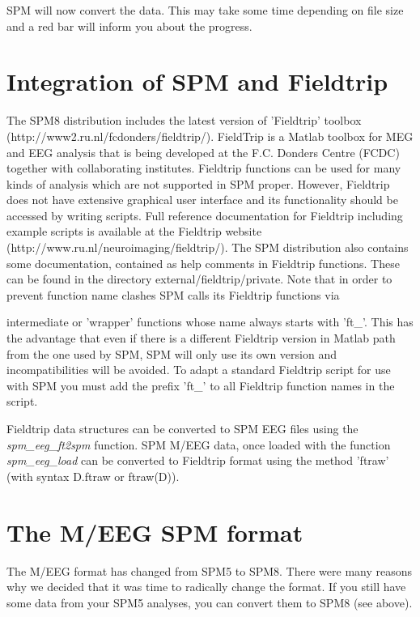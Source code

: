 SPM will now convert the data. This may take some time depending on
file size and a red bar will inform you about the progress.

\section{Integration of SPM and Fieldtrip}
The SPM8 distribution includes the latest version of 'Fieldtrip' toolbox
(http://www2.ru.nl/fcdonders/fieldtrip/). FieldTrip is a Matlab
toolbox for MEG and EEG analysis that is being developed at the
F.C. Donders Centre (FCDC) together with collaborating
institutes. Fieldtrip functions can be used for many kinds of analysis
which are not supported in SPM proper. However, Fieldtrip
does not have extensive graphical user interface and its functionality
should be accessed by writing scripts. Full reference documentation
for Fieldtrip including example scripts is available at the Fieldtrip
website (http://www.ru.nl/neuroimaging/fieldtrip/). The SPM
distribution also contains some documentation, contained as help
comments in Fieldtrip functions. These can be found in the directory 
external/fieldtrip/private. Note that in order to prevent function
name clashes SPM calls its Fieldtrip functions via 

intermediate or 'wrapper' functions whose name always starts with
'ft\_'. This has the advantage that even if there is a different Fieldtrip
version in Matlab path from the one used by SPM, SPM will only use its own
version and incompatibilities will be avoided. To adapt a standard
Fieldtrip script for use with SPM you must add the prefix 'ft\_' 
to all Fieldtrip function names in the script.

Fieldtrip data structures can be converted to SPM EEG files using
the \textit{spm\_eeg\_ft2spm} function.  SPM M/EEG data, once loaded
with the function \textit{spm\_eeg\_load} can be converted to Fieldtrip
format using the method 'ftraw' (with syntax D.ftraw or ftraw(D)).

\section{The M/EEG SPM format}
The M/EEG format has changed from SPM5 to SPM8. There were many
reasons why we decided that it was time to radically change the
format. If you still have some data from your SPM5 analyses, you can
convert them to SPM8 (see above). 

